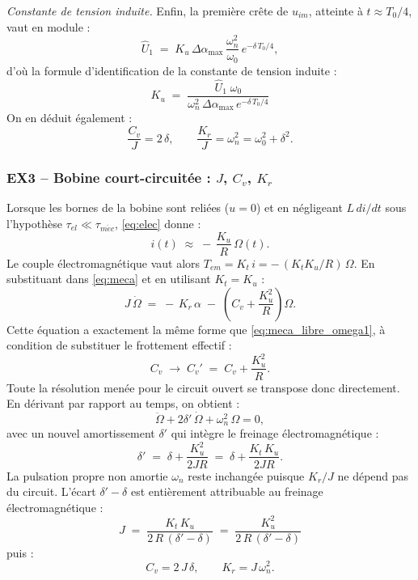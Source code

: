 \smallskip
\noindent\emph{Constante de tension induite.}
Enfin, la première crête de \(u_{im}\), atteinte à \(t \approx T_0/4\), vaut en module :
\[
\hat U_1 \;=\; K_u\,\Delta\alpha_{\max}\,\frac{\omega_n^2}{\omega_0}\,e^{-\delta\,T_0/4},
\]
d'où la formule d'identification de la constante de tension induite :
\begin{equation}
\boxed{\;K_u \;=\; \frac{\hat U_1\;\omega_0}{\omega_n^2\,\Delta\alpha_{\max}\,e^{-\delta\,T_0/4}}\;}
\label{eq:Ku_ident}
\end{equation}
On en déduit également :
\[
\frac{C_v}{J} = 2\,\delta, \qquad \frac{K_r}{J} = \omega_n^2 = \omega_0^2 + \delta^2.
\]

\subsubsection{EX3 -- Bobine court-circuitée : \texorpdfstring{\(J\)}{J}, \texorpdfstring{\(C_v\)}{Cv}, \texorpdfstring{\(K_r\)}{Kr}}

Lorsque les bornes de la bobine sont reliées (\(u = 0\)) et en négligeant \(L\,di/dt\) sous l'hypothèse \(\tau_{el} \ll \tau_{m\acute{e}c}\), \eqref{eq:elec} donne :
\begin{equation}
i(t) \;\approx\; -\,\frac{K_u}{R}\,\Omega(t).
\label{eq:i_short}
\end{equation}
Le couple électromagnétique vaut alors \(T_{em} = K_t\,i = -\,(K_t K_u/R)\,\Omega\). En substituant dans \eqref{eq:meca} et en utilisant \(K_t = K_u\) :
\begin{equation}
J\,\dot\Omega \;=\; -\,K_r\,\alpha \;-\; \!\left(C_v + \frac{K_u^2}{R}\right)\!\Omega.
\label{eq:meca_short_omega1}
\end{equation}
Cette équation a exactement la même forme que \eqref{eq:meca_libre_omega1}, à condition de substituer le frottement effectif :
\[
C_v \;\longrightarrow\; C_v' \;=\; C_v + \frac{K_u^2}{R}.
\]
Toute la résolution menée pour le circuit ouvert se transpose donc directement. En dérivant par rapport au temps, on obtient :
\begin{equation}
\ddot\Omega + 2\delta'\,\dot\Omega + \omega_n^2\,\Omega = 0,
\label{eq:meca_short}
\end{equation}
avec un nouvel amortissement \(\delta'\) qui intègre le freinage électromagnétique :
\begin{equation}
\delta' \;=\; \delta + \frac{K_u^2}{2JR} \;=\; \delta + \frac{K_t\,K_u}{2JR}.
\label{eq:deltap}
\end{equation}
La pulsation propre non amortie \(\omega_n\) reste inchangée puisque \(K_r/J\) ne dépend pas du circuit. L'écart \(\delta' - \delta\) est entièrement attribuable au freinage électromagnétique :
\begin{equation}
\boxed{\;J \;=\; \frac{K_t\,K_u}{2\,R\,(\delta' - \delta)} \;=\; \frac{K_u^2}{2\,R\,(\delta' - \delta)}\;}
\label{eq:J}
\end{equation}
puis :
\[
C_v = 2\,J\,\delta, \qquad K_r = J\,\omega_n^2.
\]


